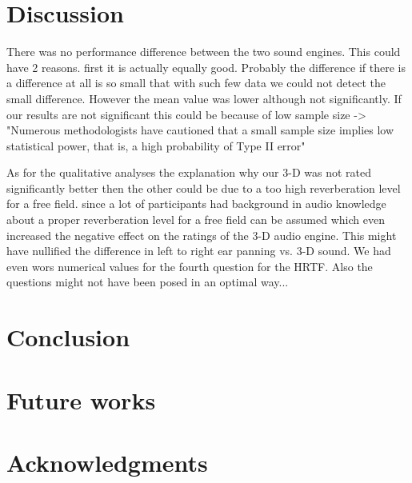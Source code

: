 \documentclass[journal]{IEEEtran}
\begin{document}
\section{Discussion}
There was no performance difference between the two sound engines. This could have 2 reasons. first it is actually equally good. Probably the difference if there is a difference at all is so small that with such few data we could not detect the small difference. However the mean value was lower although not significantly.
If our results are not significant this could be because of low sample size -> "Numerous methodologists have 
cautioned that a small sample size implies low statistical 
power, that is, a high probability of Type II error"~\cite{DeWinter2013}


As for the qualitative analyses the explanation why our 3-D was not rated significantly better then the other could be due to a too high reverberation level for a free field. since a lot of participants had background in audio knowledge about a proper reverberation level for a free field can be assumed which even increased the negative effect on the ratings of the 3-D audio engine. This might have nullified the difference in left to right ear panning vs. 3-D sound. We had even wors numerical values for the fourth question for the HRTF. Also the questions might not have been posed in an optimal way...



\section{Conclusion}


\section{Future works}



\section*{Acknowledgments}






\end{document}
